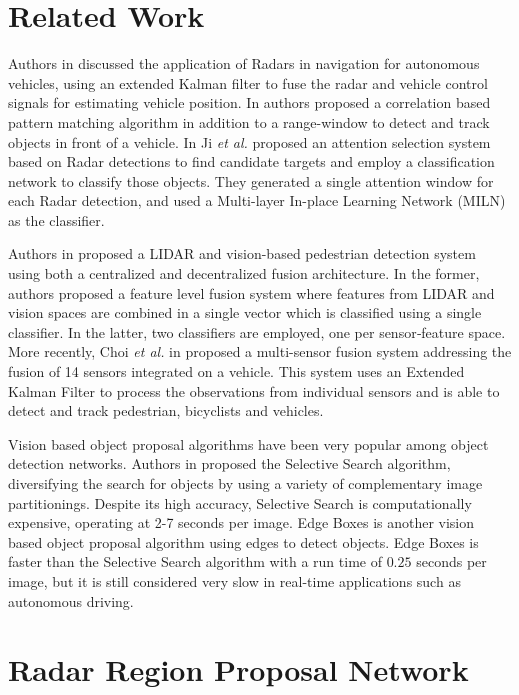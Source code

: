 \documentclass{article}
\newcommand{\ea}{\textit{et al. }}
\begin{document}
\section{Related Work}
\label{sec:related}
Authors in \cite{Gibson1994} discussed the application of Radars in navigation
for autonomous vehicles, using an extended Kalman filter to fuse the radar and
vehicle control signals for estimating vehicle position. In \cite{Miyahara2006} 
authors proposed a correlation based pattern matching algorithm in addition to 
a range-window to detect and track objects in front of a vehicle. In \cite{Ji2008} 
Ji \ea proposed an attention selection system based on Radar detections to find 
candidate targets and employ a classification network to classify those objects. 
They generated a single attention window for each Radar detection, and used a 
Multi-layer In-place Learning Network (MILN) as the classifier.

Authors in \cite{Premebida2009} proposed a LIDAR and vision-based pedestrian detection 
system using both a centralized and decentralized fusion architecture. 
In the former, authors proposed a feature level fusion system where features from LIDAR and 
vision spaces are combined in a single vector which is classified using a single 
classifier. In the latter, two classifiers are employed, one per sensor‐feature 
space. More recently, Choi \ea in \cite{Cho2014} proposed a multi-sensor fusion system 
addressing the fusion of 14 sensors integrated on a vehicle. This system uses an 
Extended Kalman Filter to process the observations from individual sensors and is 
able to detect and track pedestrian, bicyclists and vehicles.

Vision based object proposal algorithms have been very popular among object detection 
networks. Authors in \cite{ss2013} proposed the Selective Search algorithm, diversifying the search for objects by using a
variety of complementary image partitionings. Despite its high accuracy, Selective 
Search is computationally expensive, operating at 2-7 seconds per image. 
Edge Boxes \cite{edge2014} is another vision based object proposal algorithm 
using edges to detect 
objects. Edge Boxes is faster than the Selective Search algorithm with a run time of $0.25$ 
seconds per image, but it is still considered very slow in real-time 
applications such as autonomous driving.

\section{Radar Region Proposal Network}
\label{sec:rrpn}
\end{document}
